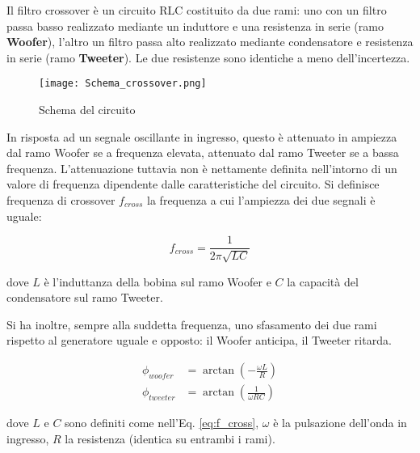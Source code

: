 \documentclass[../Relazione_circuiti]{subfiles}
\begin{document}
Il filtro crossover è un circuito RLC costituito da due rami: uno con un filtro passa basso realizzato mediante un
induttore e una resistenza in serie (ramo \textbf{Woofer}), l'altro un filtro passa alto realizzato mediante
condensatore e resistenza in serie (ramo \textbf{Tweeter}). Le due resistenze sono identiche a meno dell'incertezza.

\begin{figure}[H]
  \centering
  \texttt{[image: Schema\_crossover.png]}

  \caption{Schema del circuito}
  \label{fig:schema_circuito}

\end{figure}

In risposta ad un segnale oscillante in ingresso, questo è attenuato in ampiezza dal ramo Woofer se a frequenza elevata,
attenuato dal ramo Tweeter se a bassa frequenza. L'attenuazione tuttavia non è nettamente definita nell'intorno di un
valore di frequenza dipendente dalle caratteristiche del circuito. Si definisce frequenza di crossover $f_{cross}$ la
frequenza a cui l'ampiezza dei due segnali è uguale:

\begin{equation}
  \label{eq:f_cross}
  f_{cross} = \frac{1}{2 \pi \sqrt{LC} }
\end{equation}

dove $L$ è l'induttanza della bobina sul ramo Woofer e $C$ la capacità del condensatore sul ramo Tweeter.

Si ha inoltre, sempre alla suddetta frequenza, uno sfasamento dei due rami rispetto al generatore uguale e opposto: il
Woofer anticipa, il Tweeter ritarda.

\begin{align}
  \phi_{woofer} &= \arctan(-\frac{\omega L}{R}) \label{eq:p_woofer} \\
  \phi_{tweeter} &= \arctan(\frac{1}{\omega RC}) \label{eq:p_tweeter}
\end{align}


dove $L$ e $C$ sono definiti come nell'Eq. \eqref{eq:f_cross}, $\omega$ è la pulsazione dell'onda in ingresso, $R$ la resistenza
(identica su entrambi i rami).
\end{document}
